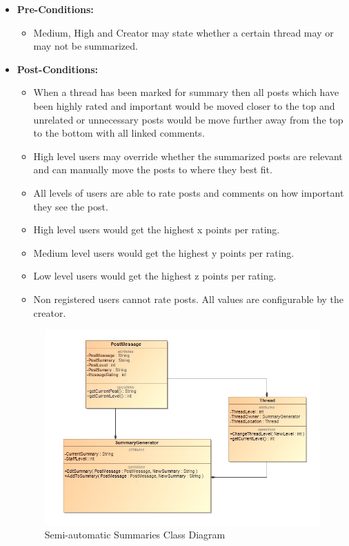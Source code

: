 \documentclass[11pt]{article}
\begin{document}
\begin{enumerate}
\begin{itemize}
	\item\textbf{Pre-Conditions: }
	\begin{itemize}
		\item Medium, High and Creator may state whether a certain thread may or may not be summarized.
	\end{itemize}	
	\item\textbf{Post-Conditions: }
	\begin{itemize}
		\item When a thread has been marked for summary then all posts which have been highly rated and important would be moved closer to the top and 	unrelated or unnecessary posts would be move further away from the top to the bottom with all linked comments. 
		\item High level users may override whether the summarized posts are relevant and can manually move the posts to where they best fit.
		\item All levels of users are able to rate posts and comments on how important they see the post.
		\item High level users would get the highest x points per rating.
		\item Medium level users would get the highest y points per rating.
		\item Low level users would get the highest z points per rating.
		\item Non registered users cannot rate posts.
		All values are configurable by the creator.
	\end{itemize}

 \graphicspath{ {../Diagrams/Andrew/} }
			 	  					 	  					 	  		
		\begin{figure}[H]	
			\includegraphics[scale=0.5,center]{B3ClassDiagram.png}
			\caption{Semi-automatic Summaries Class Diagram}
		\end{figure}
		

\end{itemize}
\end{enumerate}
\end{document}
